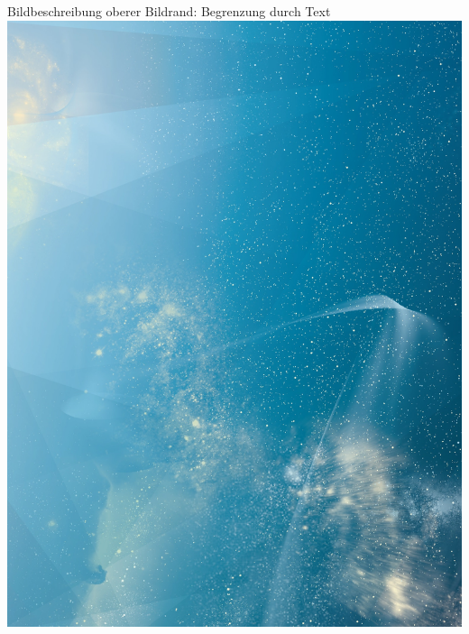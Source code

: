 \begin{frame}
    
Bildbeschreibung\newline
oberer Bildrand: Begrenzung durch Text\\[\baselineskip]

\mbox{\includegraphics[height=.5\paperheight, trim=0cm 14cm 0cm 0cm, clip=true]{./Resources/Images/SternenhimmelHochkant.jpg}}%
\hspace{6.5mm}%

\end{frame}

